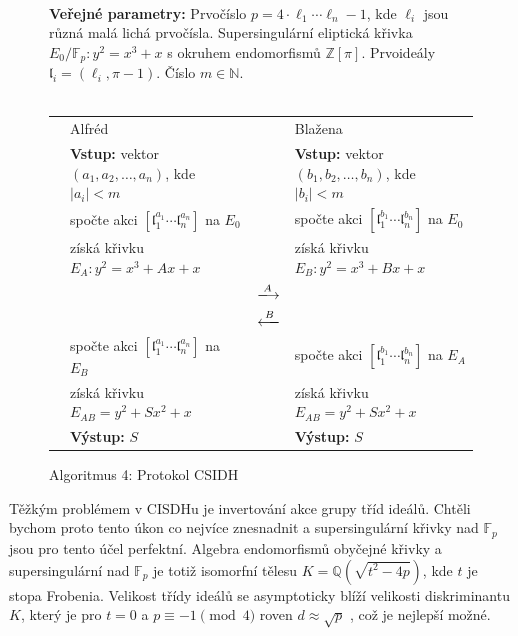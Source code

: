 \documentclass[12pt]{report}
\begin{document}
\begin{figure}[h]
\begin{center} 
\makebox[1cm]{\rule{17.3cm}{0.4pt}}\\
\hspace{-1.35cm} \textbf{Veřejné parametry:} Prvočíslo $p = 4 \cdot \ell_1 \cdots \ell_n - 1$, kde $\ell_i$ jsou různá malá lichá prvočísla. Supersingulární eliptická křivka $E_0/\mathbb{F}_p : y^2 = x^3+x$ s okruhem endomorfismů $\mathbb{Z}[\pi]$. Prvoideály $\mathfrak{l}_i = (\ell_i, \pi - 1)$. Číslo $m \in \mathbb{N}$.\\

\vspace{-0.25cm}
\makebox[\linewidth]{\rule{17.3cm}{0.4pt}}\\
\vspace{0.2cm}
\hspace*{-1cm}\begin{tabular}{l l c l}
 \cline{2-2} \cline{4-4} 
& Alfréd & & Blažena \\ 
\cline{2-2} \cline{4-4} 
& \textbf{Vstup:} vektor $(a_1,a_2,\dots,a_n)$, kde $\vert a_i \vert < m$  & &  \textbf{Vstup:} vektor $(b_1,b_2,\dots,b_n)$, kde $\vert b_i \vert < m$\\
&spočte akci $[\mathfrak{l}_1 ^{a_1} \cdots \mathfrak{l}_n ^{a_n}]$ na $E_0$ & &spočte akci $[\mathfrak{l}_1 ^{b_1} \cdots \mathfrak{l}_n ^{b_n}]$ na $E_0$\\
&získá křivku $E_A : y^2 = x^3 + Ax + x$& &získá křivku $E_B: y^2 = x^3 + Bx + x$\\
 & & $\xlongrightarrow{A}$  &  \\
&  & $\xlongleftarrow{B} $ &  \\
& spočte akci $[\mathfrak{l}_1 ^{a_1} \cdots \mathfrak{l}_n ^{a_n}]$ na $E_B$ & & spočte akci $[\mathfrak{l}_1 ^{b_1} \cdots \mathfrak{l}_n ^{b_n}]$ na $E_A$\\
& získá křivku $E_{AB} = y^2 + Sx^2 + x$ &  & získá křivku $E_{AB} = y^2 + Sx^2 + x$ \\
& \textbf{Výstup:} $S$ & & \textbf{Výstup:} $S$
\end{tabular}
\caption*{Algoritmus 4: Protokol CSIDH}
\end{center}
\end{figure}

Těžkým problémem v CISDHu je invertování akce grupy tříd ideálů. Chtěli bychom proto tento úkon co nejvíce znesnadnit a supersingulární křivky nad $\mathbb{F}_p$ jsou pro tento účel perfektní. Algebra endomorfismů obyčejné křivky a supersingulární nad $\mathbb{F}_p$ je totiž isomorfní tělesu $ K = \mathbb{Q}(\sqrt{t^2-4p})$, kde $t$ je stopa Frobenia. Velikost třídy ideálů se asymptoticky blíží velikosti diskriminantu $K$, který je pro $t = 0$ a $p  \equiv -1 \pmod{4}$ roven $d \approx \sqrt{p}$ \cite{Siegel}, což je nejlepší možné. 
\end{document}
